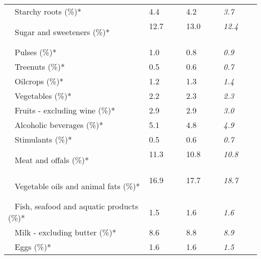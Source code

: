 \begin{tabular}{L{3.9cm} R{1cm} R{1cm} R{1cm}}
	 ~ Starchy roots (\%)* & 4.4 ~ \ \ & 4.2 ~ \ \ & \textit{3.7} ~ \ \ \\ 
	 ~ Sugar and sweeteners (\%)* & 12.7 ~ \ \ & 13.0 ~ \ \ & \textit{12.4} ~ \ \ \\ 
	 ~ Pulses (\%)* & 1.0 ~ \ \ & 0.8 ~ \ \ & \textit{0.9} ~ \ \ \\ 
	 ~ Treenuts (\%)* & 0.5 ~ \ \ & 0.6 ~ \ \ & \textit{0.7} ~ \ \ \\ 
	 ~ Oilcrops (\%)* & 1.2 ~ \ \ & 1.3 ~ \ \ & \textit{1.4} ~ \ \ \\ 
	 ~ Vegetables (\%)* & 2.2 ~ \ \ & 2.3 ~ \ \ & \textit{2.3} ~ \ \ \\ 
	 ~ Fruits - excluding wine (\%)* & 2.9 ~ \ \ & 2.9 ~ \ \ & \textit{3.0} ~ \ \ \\ 
	 ~ Alcoholic beverages (\%)* & 5.1 ~ \ \ & 4.8 ~ \ \ & \textit{4.9} ~ \ \ \\ 
	 ~ Stimulants (\%)* & 0.5 ~ \ \ & 0.6 ~ \ \ & \textit{0.7} ~ \ \ \\ 
	 ~ Meat and offals (\%)* & 11.3 ~ \ \ & 10.8 ~ \ \ & \textit{10.8} ~ \ \ \\ 
	 ~ Vegetable oils and animal fats (\%)* & 16.9 ~ \ \ & 17.7 ~ \ \ & \textit{18.7} ~ \ \ \\ 
	 ~ Fish, seafood and aquatic products (\%)* & 1.5 ~ \ \ & 1.6 ~ \ \ & \textit{1.6} ~ \ \ \\ 
	 ~ Milk - excluding butter (\%)* & 8.6 ~ \ \ & 8.8 ~ \ \ & \textit{8.9} ~ \ \ \\ 
	 ~ Eggs (\%)* & 1.6 ~ \ \ & 1.6 ~ \ \ & \textit{1.5} ~ \ \ \\ 
       \toprule
      \end{tabular}
      \clearpage
{}
